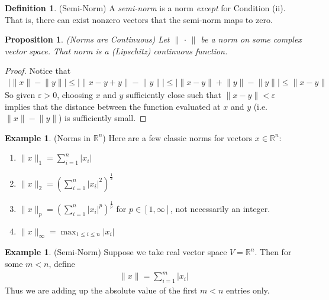 \documentclass[12pt]{book}
\numberwithin{equation}{section} %
\theoremstyle{plain}
\newtheorem{prop}[thm]{Proposition}
\theoremstyle{definition}
\newtheorem{defn}[thm]{Definition}
\newtheorem{ex}[thm]{Example}
\theoremstyle{remark}
\newcommand{\Rn}{\mathbb{R}^n}
\begin{document}
\begin{defn}(Semi-Norm)
A \emph{semi-norm} is a norm \emph{except} for Condition (ii). That is,
there can exist nonzero vectors that the semi-norm maps to zero.
\end{defn}

\begin{prop}\emph{(Norms are Continuous)}
Let $\lVert \,\cdot\,\rVert$ be a norm on some complex vector space.
That norm is a (Lipschitz) continuous function.
\end{prop}
\begin{proof}
Notice that
\begin{align*}
    \big\lvert \lVert x \rVert - \lVert y\rVert \big\rvert
    \leq
    \big\lvert \lVert x - y + y\rVert - \lVert y\rVert \big\rvert
    \leq
    \big\lvert \lVert x - y \rVert + \lVert y\rVert - \lVert y\rVert \big\rvert
    \leq
    \lVert x - y \rVert
\end{align*}
So given $\varepsilon>0$, choosing $x$ and $y$ sufficiently close such
that $\lVert x-y\rVert<\varepsilon$ implies that the distance between
the function evaluated at $x$ and $y$ (i.e.
$\lVert x\rVert- \lVert y\rVert$) is sufficiently small.
\end{proof}


\begin{ex}(Norms in $\Rn$)
Here are a few classic norms for vectors $x\in \Rn$:
\begin{enumerate}
\item $\lVert x\rVert_1 = \sum^n_{i=1} |x_i|$
\item $\lVert x\rVert_2 = \left(\sum_{i=1}^n |x_i|^2\right)^{\frac{1}{2}}$
\item $\lVert x\rVert_p = \left(\sum_{i=1}^n
  |x_i|^p\right)^{\frac{1}{p}}$ for $p\in[1,\infty]$, not necessarily an
  integer.
\item $\lVert x\rVert_\infty = \max_{1\leq i\leq n} |x_i|$
\end{enumerate}
\end{ex}

\begin{ex}(Semi-Norm)
Suppose we take real vector space $V=\Rn$. Then for some $m<n$, define
\begin{align*}
  \lVert x\rVert = \sum_{i=1}^m |x_i|
\end{align*}
Thus we are adding up the absolute value of the first $m<n$ entries
only.
\end{ex}
\end{document}
